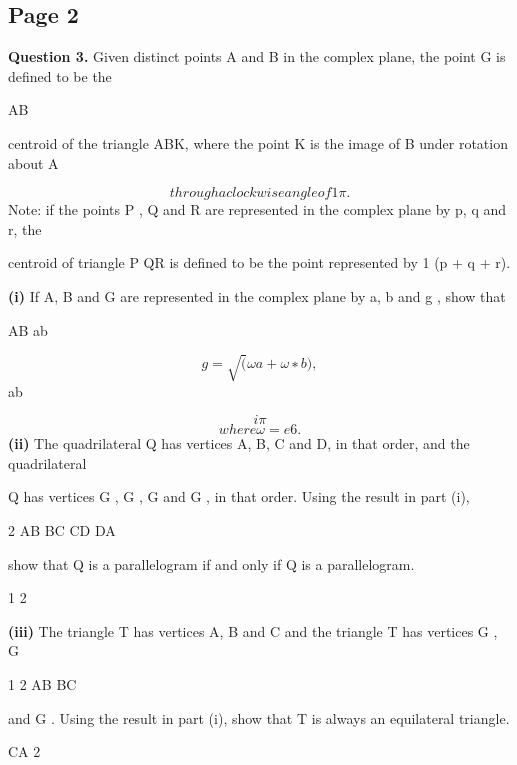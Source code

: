 \documentclass[12pt]{article}
\begin{document}
\subsection*{Page 2}
\begin{flushleft}
\bigskip\textbf{Question 3.} Given distinct points A and B in the complex plane, the point G is defined to be the\par
AB\par
centroid of the triangle ABK, where the point K is the image of B under rotation about A\par
\[through a clockwise angle of 1 \pi.\]
Note: if the points P , Q and R are represented in the complex plane by p, q and r, the\par
centroid of triangle P QR is defined to be the point represented by 1 (p + q + r).\par
\textbf{(i)} If A, B and G are represented in the complex plane by a, b and g , show that\par
AB ab\par
\[g = \sqrt (ωa + ω∗b),\]
ab\par
\[i\pi\]
\[where ω = e 6 .\]
\textbf{(ii)} The quadrilateral Q has vertices A, B, C and D, in that order, and the quadrilateral\par
Q has vertices G , G , G and G , in that order. Using the result in part (i),\par
2 AB BC CD DA\par
show that Q is a parallelogram if and only if Q is a parallelogram.\par
1 2\par
\textbf{(iii)} The triangle T has vertices A, B and C and the triangle T has vertices G , G\par
1 2 AB BC\par
and G . Using the result in part (i), show that T is always an equilateral triangle.\par
CA 2\par
\end{flushleft}
\end{document}
